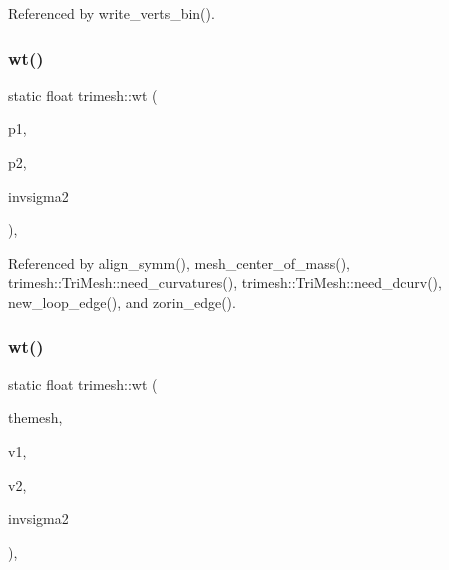 Referenced by write\+\_\+verts\+\_\+bin().

\mbox{\label{namespacetrimesh_a16cbd25f270d7b7e59ab643cbcbc3f30}} 
\subsubsection{\texorpdfstring{wt()}{wt()}\hspace{0.1cm}{\footnotesize\ttfamily [1/2]}}
{\footnotesize\ttfamily static float trimesh\+::wt (\begin{DoxyParamCaption}\item[{const \hyperlink{namespacetrimesh_a325b99fd6454b22fa4c4bc3223271b2c}{point} \&}]{p1,  }\item[{const \hyperlink{namespacetrimesh_a325b99fd6454b22fa4c4bc3223271b2c}{point} \&}]{p2,  }\item[{float}]{invsigma2 }\end{DoxyParamCaption})\hspace{0.3cm}{\ttfamily [inline]}, {\ttfamily [static]}}



Referenced by align\+\_\+symm(), mesh\+\_\+center\+\_\+of\+\_\+mass(), trimesh\+::\+Tri\+Mesh\+::need\+\_\+curvatures(), trimesh\+::\+Tri\+Mesh\+::need\+\_\+dcurv(), new\+\_\+loop\+\_\+edge(), and zorin\+\_\+edge().

\mbox{\label{namespacetrimesh_ad8da87245d58b4883f726ae35f03d062}} 
\subsubsection{\texorpdfstring{wt()}{wt()}\hspace{0.1cm}{\footnotesize\ttfamily [2/2]}}
{\footnotesize\ttfamily static float trimesh\+::wt (\begin{DoxyParamCaption}\item[{const \hyperlink{classtrimesh_1_1TriMesh}{Tri\+Mesh} $\ast$}]{themesh,  }\item[{int}]{v1,  }\item[{int}]{v2,  }\item[{float}]{invsigma2 }\end{DoxyParamCaption})\hspace{0.3cm}{\ttfamily [inline]}, {\ttfamily [static]}}



